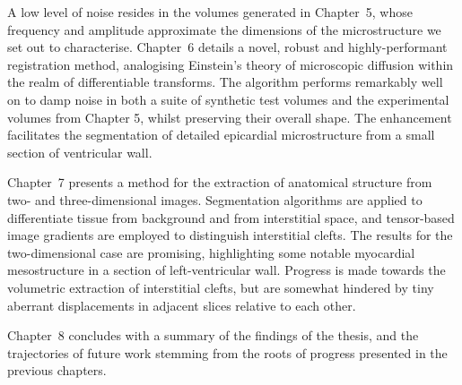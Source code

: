   A low level of noise resides in the volumes generated in Chapter~5, whose frequency and amplitude approximate the dimensions of the microstructure we set out to characterise. Chapter~6 details a novel, robust and highly-performant registration method, analogising Einstein's theory of microscopic diffusion within the realm of differentiable transforms. The algorithm performs remarkably well on to damp noise in both a suite of synthetic test volumes and the experimental volumes from Chapter 5, whilst preserving their overall shape. The enhancement facilitates the segmentation of detailed epicardial microstructure from a small section of ventricular wall.
  
  Chapter~7 presents a method for the extraction of anatomical structure from two- and three-dimensional images. Segmentation algorithms are applied to differentiate tissue from background and from interstitial space, and tensor-based image gradients are employed to distinguish interstitial clefts.  The results for the two-dimensional case are promising, highlighting some notable myocardial mesostructure in a section of left-ventricular wall. Progress is made towards the volumetric extraction of interstitial clefts, but are somewhat hindered by tiny aberrant displacements in adjacent slices relative to each other.
  
  Chapter~8 concludes with a summary of the findings of the thesis, and the  trajectories of future work stemming from the roots of progress presented in the previous chapters.
